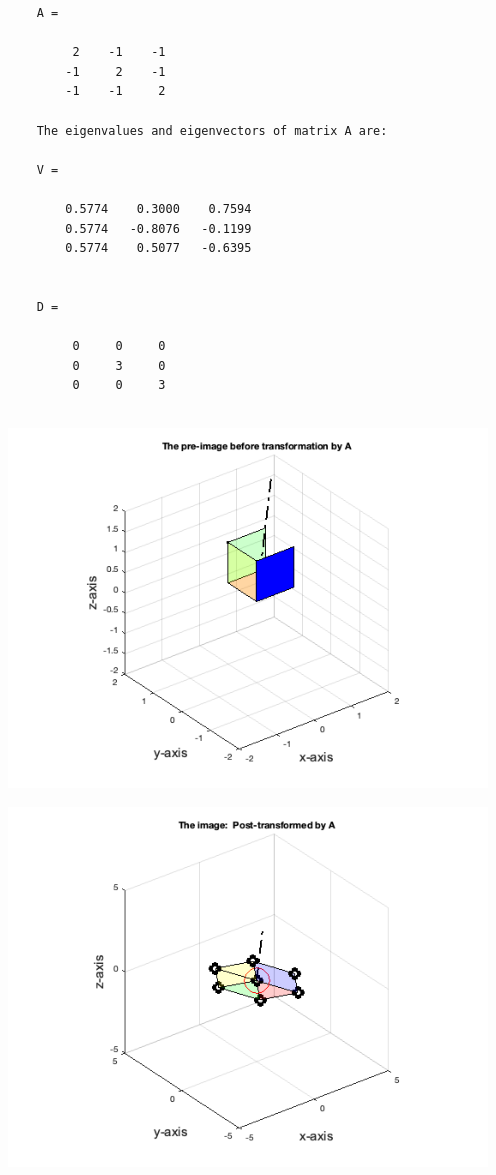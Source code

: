 \documentclass{article}
\begin{document}
\begin{verbatim}
	A =
	
		 2    -1    -1
		-1     2    -1
		-1    -1     2
	
	The eigenvalues and eigenvectors of matrix A are:
	
	V =
	
		0.5774    0.3000    0.7594
		0.5774   -0.8076   -0.1199
		0.5774    0.5077   -0.6395
	
	
	D =
	
		 0     0     0
		 0     3     0
		 0     0     3
	
	\end{verbatim}


\begin{center}
	\includegraphics [width=5in]{Problem5_transformation_01.png}
	
	\includegraphics [width=5in]{Problem5_transformation_02.png}
	
\end{center}
\end{document}
